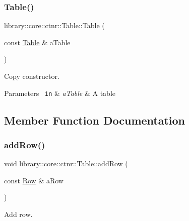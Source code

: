 \subsubsection{\texorpdfstring{Table()}{Table()}\hspace{0.1cm}{\footnotesize\ttfamily [3/3]}}
{\footnotesize\ttfamily library\+::core\+::ctnr\+::\+Table\+::\+Table (\begin{DoxyParamCaption}\item[{const \mbox{\hyperlink{classlibrary_1_1core_1_1ctnr_1_1_table}{Table}} \&}]{a\+Table }\end{DoxyParamCaption})}



Copy constructor. 


\begin{DoxyParams}[1]{Parameters}
\mbox{\texttt{ in}}  & {\em a\+Table} & A table \\
\hline
\end{DoxyParams}


\subsection{Member Function Documentation}
\mbox{\label{classlibrary_1_1core_1_1ctnr_1_1_table_a9c9b8b7a2eca260d58b721c4f465a7d3}} 
\subsubsection{\texorpdfstring{addRow()}{addRow()}}
{\footnotesize\ttfamily void library\+::core\+::ctnr\+::\+Table\+::add\+Row (\begin{DoxyParamCaption}\item[{const \mbox{\hyperlink{classlibrary_1_1core_1_1ctnr_1_1table_1_1_row}{Row}} \&}]{a\+Row }\end{DoxyParamCaption})}



Add row. 


\begin{DoxyCode}{0}
\end{DoxyCode}



